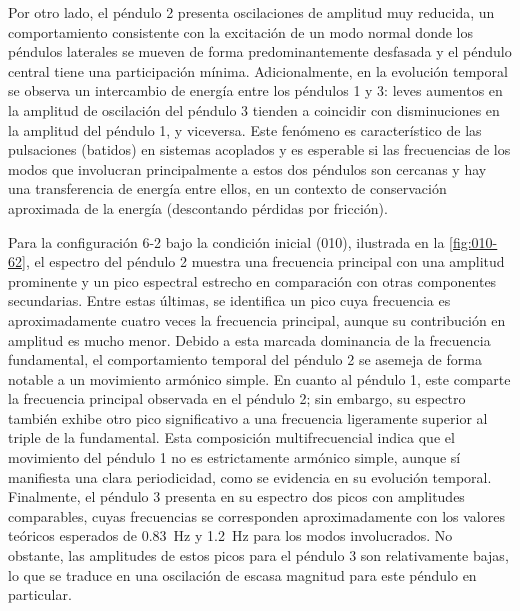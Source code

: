 Por otro lado, el p\'endulo 2 presenta oscilaciones de amplitud muy
reducida, un comportamiento consistente con la excitaci\'on de un
modo normal donde los p\'endulos laterales se mueven de forma
predominantemente desfasada y el p\'endulo central tiene una
participaci\'on m\'inima. Adicionalmente, en la evoluci\'on temporal
se observa un intercambio de energ\'ia entre los p\'endulos 1 y 3:
leves aumentos en la amplitud de oscilaci\'on del p\'endulo 3 tienden
a coincidir con disminuciones en la amplitud del p\'endulo 1, y
viceversa. Este fen\'omeno es caracter\'istico de las pulsaciones
(batidos) en sistemas acoplados y es esperable si las frecuencias
de los modos que involucran principalmente a estos dos p\'endulos son
cercanas y hay una transferencia de energ\'ia entre ellos, en un
contexto de conservaci\'on aproximada de la energ\'ia (descontando
p\'erdidas por fricci\'on).

Para la configuraci\'on 6-2 bajo la condici\'on inicial (010),
ilustrada en la \cref{fig:010-62}, el espectro del
p\'endulo 2 muestra una frecuencia principal con una amplitud
prominente y un pico espectral estrecho en comparaci\'on con otras
componentes secundarias. Entre estas \'ultimas, se identifica un pico
cuya frecuencia es aproximadamente cuatro veces la frecuencia
principal, aunque su contribuci\'on en amplitud es mucho menor.
Debido a esta marcada dominancia de la frecuencia fundamental, el
comportamiento temporal del p\'endulo 2 se asemeja de forma notable
a un movimiento arm\'onico simple. En cuanto al p\'endulo 1, este
comparte la frecuencia principal observada en el p\'endulo 2; sin
embargo, su espectro tambi\'en exhibe otro pico significativo a una
frecuencia ligeramente superior al triple de la fundamental. Esta
composici\'on multifrecuencial indica que el movimiento del p\'endulo
1 no es estrictamente arm\'onico simple, aunque s\'i manifiesta una
clara periodicidad, como se evidencia en su evoluci\'on temporal.
Finalmente, el p\'endulo 3 presenta en su espectro dos picos con
amplitudes comparables, cuyas frecuencias se corresponden
aproximadamente con los valores te\'oricos esperados de \qty{0.83}{\Hz}
y \qty{1.2}{\Hz} para los modos involucrados. No obstante, las
amplitudes de estos picos para el p\'endulo 3 son relativamente
bajas, lo que se traduce en una oscilaci\'on de escasa magnitud para
este p\'endulo en particular.

